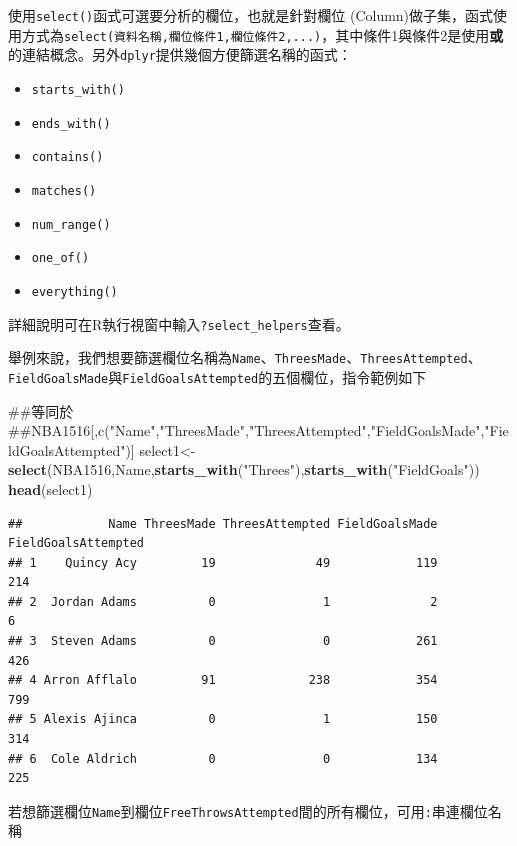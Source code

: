 \documentclass[]{book}
\newenvironment{Shaded}{\begin{snugshade}}{\end{snugshade}}
\newcommand{\KeywordTok}[1]{\textcolor[rgb]{0.13,0.29,0.53}{\textbf{{#1}}}}
\newcommand{\StringTok}[1]{\textcolor[rgb]{0.31,0.60,0.02}{{#1}}}
\newcommand{\NormalTok}[1]{{#1}}
\providecommand{\tightlist}{%
  \setlength{\itemsep}{0pt}\setlength{\parskip}{0pt}}
\theoremstyle{definition}
\theoremstyle{definition}
\theoremstyle{remark}
\begin{document}
使用\texttt{select()}函式可選要分析的欄位，也就是針對欄位
(Column)做子集，函式使用方式為\texttt{select(資料名稱,欄位條件1,欄位條件2,...)}，其中條件1與條件2是使用\textbf{或}的連結概念。另外\texttt{dplyr}提供幾個方便篩選名稱的函式：

\begin{itemize}
\tightlist
\item
  \texttt{starts\_with()}
\item
  \texttt{ends\_with()}
\item
  \texttt{contains()}
\item
  \texttt{matches()}
\item
  \texttt{num\_range()}
\item
  \texttt{one\_of()}
\item
  \texttt{everything()}
\end{itemize}

詳細說明可在R執行視窗中輸入\texttt{?select\_helpers}查看。

舉例來說，我們想要篩選欄位名稱為\texttt{Name}、\texttt{ThreesMade}、\texttt{ThreesAttempted}、\texttt{FieldGoalsMade}與\texttt{FieldGoalsAttempted}的五個欄位，指令範例如下

\begin{Shaded}
\begin{Highlighting}[]
\NormalTok{##等同於}
\NormalTok{##NBA1516[,c("Name","ThreesMade","ThreesAttempted","FieldGoalsMade","FieldGoalsAttempted")]}
\NormalTok{select1<-}\KeywordTok{select}\NormalTok{(NBA1516,Name,}\KeywordTok{starts_with}\NormalTok{(}\StringTok{"Threes"}\NormalTok{),}\KeywordTok{starts_with}\NormalTok{(}\StringTok{"FieldGoals"}\NormalTok{))}
\KeywordTok{head}\NormalTok{(select1)}
\end{Highlighting}
\end{Shaded}

\begin{verbatim}
##            Name ThreesMade ThreesAttempted FieldGoalsMade FieldGoalsAttempted
## 1    Quincy Acy         19              49            119                 214
## 2  Jordan Adams          0               1              2                   6
## 3  Steven Adams          0               0            261                 426
## 4 Arron Afflalo         91             238            354                 799
## 5 Alexis Ajinca          0               1            150                 314
## 6  Cole Aldrich          0               0            134                 225
\end{verbatim}

若想篩選欄位\texttt{Name}到欄位\texttt{FreeThrowsAttempted}間的所有欄位，可用\texttt{:}串連欄位名稱
\end{document}
